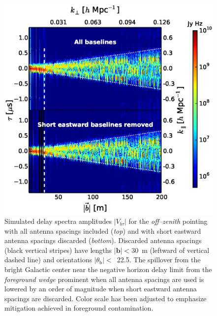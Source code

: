 \documentclass[preprint2,iop,numberedappendix]{emulateapj}
\begin{document}
\begin{figure}[htb]
\centering
\includegraphics[width=\linewidth]{f12.eps}
\caption{Simulated delay spectra amplitudes $|V_{b\tau}|$ for the {\it off--zenith} pointing with all antenna spacings included ({\it top}) and with short eastward antenna spacings discarded ({\it bottom}). Discarded antenna spacings (black vertical stripes) have lengths $|\boldsymbol{b}|<30$~m (leftward of vertical dashed line) and orientations $|\theta_\textrm{b}|<$~22.5\arcdeg. The spillover from the bright Galactic center near the negative horizon delay limit from the {\it foreground wedge} prominent when all antenna spacings are used is lowered by an order of magnitude when short eastward antenna spacings are discarded. Color scale has been adjusted to emphasize mitigation achieved in foreground contamination. \label{fig:before-after}}
\end{figure}
\end{document}
